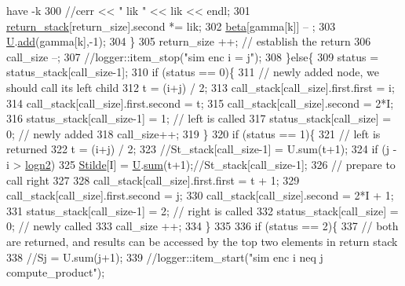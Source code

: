 \begin{DoxyCode}
{       have -k}
300         \textcolor{comment}{//cerr << " lik " << lik << endl;}
301         \hyperlink{namespacehelper__vars_a6d2100c373830cacd232319a9958652d}{return\_stack}[return\_size].second *= lik;
302         \hyperlink{classgraph__encoder_a40880adecfd63fb86e94b4b0fc3f6bc2}{beta}[gamma[k]] -- ;
303         \hyperlink{classgraph__encoder_a3314c40920f2ee132958a6b0ce7e7995}{U}.\hyperlink{classreverse__fenwick__tree_a942d7f49b37e53ebfec3076d177691d7}{add}(gamma[k],-1);
304       \}
305       return\_size ++; \textcolor{comment}{// establish the return}
306       call\_size --;
307       \textcolor{comment}{//logger::item\_stop("sim enc i = j");}
308     \}\textcolor{keywordflow}{else}\{
309       status = status\_stack[call\_size-1];
310       \textcolor{keywordflow}{if} (status == 0)\{
311         \textcolor{comment}{// newly added node, we should call its left child}
312         t = (i+j) / 2;
313         call\_stack[call\_size].first.first = i;
314         call\_stack[call\_size].first.second = t;
315         call\_stack[call\_size].second = 2*I;
316         status\_stack[call\_size-1] = 1; \textcolor{comment}{// left is called}
317         status\_stack[call\_size] = 0; \textcolor{comment}{// newly added}
318         call\_size++;
319       \}
320       \textcolor{keywordflow}{if} (status == 1)\{
321         \textcolor{comment}{// left is returned}
322         t = (i+j) / 2;
323         \textcolor{comment}{//St\_stack[call\_size-1] = U.sum(t+1);}
324         \textcolor{keywordflow}{if} (j - i > \hyperlink{classgraph__encoder_a27fde3a95a280304877b1e37fc4d8553}{logn2})
325           \hyperlink{classgraph__encoder_a342688a3fdee511b7fae3f155cfb10cf}{Stilde}[I] = \hyperlink{classgraph__encoder_a3314c40920f2ee132958a6b0ce7e7995}{U}.\hyperlink{classreverse__fenwick__tree_a672731fd6395b4853430073a099a80e6}{sum}(t+1);\textcolor{comment}{//St\_stack[call\_size-1];}
326         \textcolor{comment}{// prepare to call right}
327         
328         call\_stack[call\_size].first.first = t + 1;
329         call\_stack[call\_size].first.second = j;
330         call\_stack[call\_size].second = 2*I + 1;
331         status\_stack[call\_size-1] = 2; \textcolor{comment}{// right is called}
332         status\_stack[call\_size] = 0; \textcolor{comment}{// newly called}
333         call\_size ++;
334       \}
335 
336       \textcolor{keywordflow}{if} (status == 2)\{
337         \textcolor{comment}{// both are returned, and results can be accessed by the top two elements in return stack}
338         \textcolor{comment}{//Sj = U.sum(j+1);}
339         \textcolor{comment}{//logger::item\_start("sim enc i neq j compute\_product");}

\end{DoxyCode}
